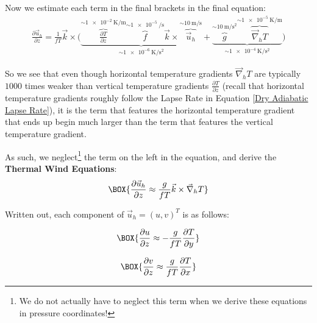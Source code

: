 Now we estimate each term in the final brackets in the final equation:
\begin{align*}
    \frac{\partial \vec{u}_h}{\partial z}=\frac{1}{fT}\vec{k}\times\biggl( 
        \underbrace{\overbrace{\frac{\partial T}{\partial z}}^{\sim\qty{1e-2}{\kelvin\per\meter}}
        \overbrace{f}^{\sim\qty{1e-5}{\per\second}}
        \vec{k}\times
        \overbrace{\vec{u}_h}^{\sim\qty{10}{\meter\per\second}}}_{\sim \qty{1e-6}{\kelvin\per\square\second}}
        +
        \underbrace{\overbrace{g}^{\sim\qty{10}{\meter\per\square\second}}
        \overbrace{\vec{\nabla}_h T}^{\sim\qty{1e-5}{\kelvin\per\meter}}}_{\sim\qty{1e-4}{\kelvin\per\square\second}}
    \biggr)
\end{align*}

So we see that even though horizontal temperature gradients $\vec{\nabla}_h T$ are typically $1000$ times weaker than vertical temperature gradients $\frac{\partial T}{\partial z}$ (recall that horizontal temperature gradients roughly follow the Lapse Rate in Equation \ref{Dry Adiabatic Lapse Rate}), it is the term that features the horizontal temperature gradient that ends up begin much larger than the term that features the vertical temperature gradient.

As such, we neglect\footnote{
    We do not actually have to neglect this term when we derive these equations in pressure coordinates!
} the term on the left in the equation, and derive the \textbf{Thermal Wind Equations}:
\begin{align}\label{Thermal Wind}
    \BOX{\frac{\partial\vec{u}_h}{\partial z}\approx\frac{g}{fT}\vec{k}\times\vec{\nabla}_hT}
\end{align}

Written out, each component of $\vec{u}_h=(u,v)^T$ is as follows:

\begin{minipage}{0.45\linewidth}
    \begin{align}
        \label{u Thermal}
        \BOX{\frac{\partial u}{\partial z} \approx-\frac{g}{f T}\frac{\partial T}{\partial y}}
    \end{align}
\end{minipage}
\hfill
\begin{minipage}{0.45\linewidth}
    \begin{align}
        \label{v Thermal}
        \BOX{\frac{\partial v}{\partial z} \approx \frac{g}{f T}\frac{\partial T}{\partial x}}
    \end{align}
\end{minipage}

